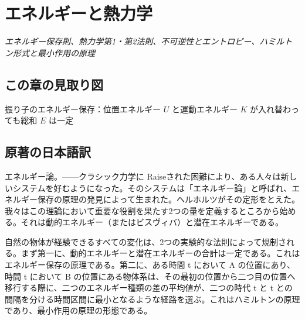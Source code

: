 \documentclass[a4paper,11pt,openany]{ltjsbook}
\begin{document}
\clearpage
\chapter{エネルギーと熱力学}
\begin{center}\large\textit{エネルギー保存則、熱力学第1・第2法則、不可逆性とエントロピー、ハミルトン形式と最小作用の原理}\end{center}

\section*{この章の見取り図}
\begin{center}


\small 振り子のエネルギー保存：位置エネルギー $U$ と運動エネルギー $K$ が入れ替わっても総和 $E$ は一定
\end{center}

\section{原著の日本語訳}
エネルギー論。——クラシック力学に Raiseされた困難により、ある人々は新しいシステムを好むようになった。そのシステムは「エネルギー論」と呼ばれ、エネルギー保存の原理の発見によって生まれた。ヘルホルツがその定形をとえた。我々はこの理論において重要な役割を果たす2つの量を定義するところから始める。それは動的エネルギー（またはビスヴィバ）と潜在エネルギーである。

自然の物体が経験できるすべての変化は、2つの実験的な法則によって規制される。まず第一に、動的エネルギーと潜在エネルギーの合計は一定である。これはエネルギー保存の原理である。第二に、ある時間 t において A の位置にあり、時間 t において B の位置にある物体系は、その最初の位置から二つ目の位置へ移行する際に、二つのエネルギー種類の差の平均値が、二つの時代 t と t との間隔を分ける時間区間に最小となるような経路を選ぶ。これはハミルトンの原理であり、最小作用の原理の形態である。
\end{document}
